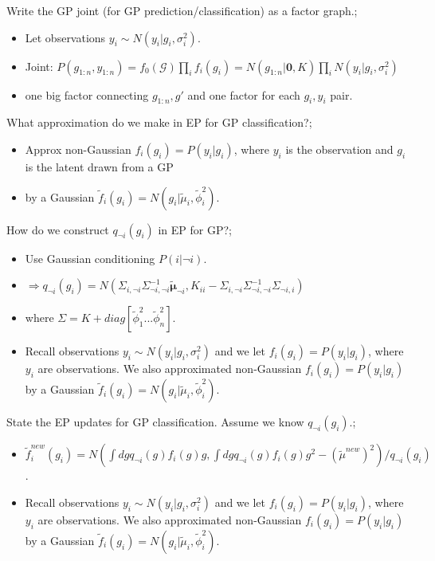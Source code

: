 \documentclass{article}
\begin{document}
Write the GP joint (for GP prediction/classification) as a factor graph.; \begin{itemize}
    \item Let observations $y_i \sim N(y_i | g_i, \sigma^2_i)$.
    \item Joint: $P(g_{1:n}, y_{1:n}) = f_0(\mathcal{G})\prod_i f_i(g_i) = N(g_{1:n}|\mathbf{0}, K) \prod_i N(y_i|g_i, \sigma^2_i)$
    \item one big factor connecting $g_{1:n}, g'$ and one factor for each $g_i, y_i$ pair.
\end{itemize}

What approximation do we make in EP for GP classification?; \begin{itemize}
    \item Approx non-Gaussian $f_i(g_i) = P(y_i|g_i)$, where $y_i$ is the observation and $g_i$ is the latent drawn from a GP
    \item by a Gaussian $\tilde{f}_i(g_i) = N(g_i | \tilde{\mu}_i, \tilde{\phi}^2_i)$.
\end{itemize}

How do we construct $q_{\neg i}(g_i)$ in EP for GP?; \begin{itemize}
    \item Use Gaussian conditioning $P(i | \neg i)$.
    \item $\Rightarrow q_{\neg i}(g_i) = N(\Sigma_{i, \neg i}\Sigma^{-1}_{\neg i, \neg i} \mathbf{\tilde{\mu}}_{\neg i}, K_{ii}-\Sigma_{i, \neg i}\Sigma^{-1}_{\neg i, \neg i}\Sigma_{\neg i, i})$
    \item where $\Sigma = K + diag[\tilde{\phi}^2_1...\tilde{\phi}^2_n]$.
    \item Recall observations $y_i \sim N(y_i | g_i, \sigma^2_i)$ and we let $f_i(g_i) = P(y_i|g_i)$, where $y_i$ are observations. We also approximated non-Gaussian $f_i(g_i) = P(y_i|g_i)$ by a Gaussian $\tilde{f}_i(g_i) = N(g_i | \tilde{\mu}_i, \tilde{\phi}^2_i)$.
\end{itemize}

State the EP updates for GP classification. Assume we know $q_{\neg i}(g_i)$.; \begin{itemize}
    \item $\tilde{f}_i^{new}(g_i) = N(\int dg q_{\neg i}(g)f_i(g)g, \int dg q_{\neg i}(g)f_i(g)g^2 - (\tilde{\mu}^{new})^2)/q_{\neg i}(g_i)$.
    \item Recall observations $y_i \sim N(y_i | g_i, \sigma^2_i)$ and we let $f_i(g_i) = P(y_i|g_i)$, where $y_i$ are observations. We also approximated non-Gaussian $f_i(g_i) = P(y_i|g_i)$ by a Gaussian $\tilde{f}_i(g_i) = N(g_i | \tilde{\mu}_i, \tilde{\phi}^2_i)$.
\end{itemize}
\end{document}
